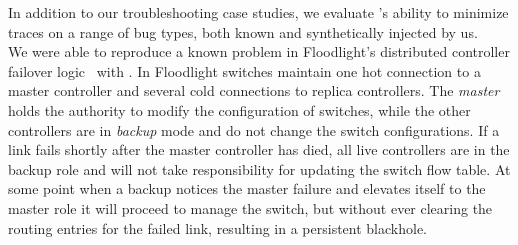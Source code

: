 In addition to our troubleshooting case studies, we evaluate
\projectname's ability to minimize traces on a range of bug types,
both known and synthetically injected by us.\\[0.5ex]
%
 We were able to reproduce a
known problem in Floodlight's distributed controller failover logic~\cite{floodlight_bug} with
\projectname. In Floodlight switches maintain one hot connection to a master controller and
several cold connections to replica controllers. The \emph{master} holds the
authority to modify the configuration of switches, while the other
controllers are in \emph{backup} mode and do not change the
switch configurations. %
If a link fails shortly after the master
controller has died, all live controllers are in
the backup role and will not take responsibility for updating the switch
flow table. At some point when a backup notices the master failure and
elevates itself to the master role it will proceed to manage
the switch, but without ever clearing the routing entries for
the failed link, resulting in a persistent blackhole.

